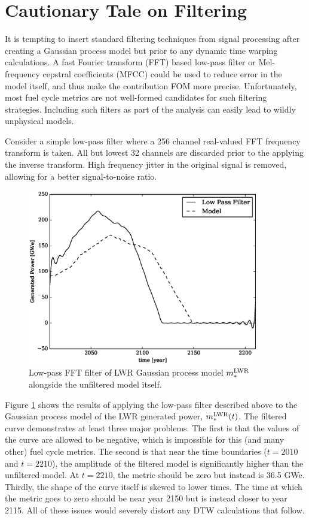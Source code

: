 \clearpage
\section{Cautionary Tale on Filtering}
\label{filtering}

It is tempting to insert standard filtering techniques from signal processing 
after creating a Gaussian process model but prior to any dynamic time warping 
calculations. A fast Fourier transform (FFT) based low-pass filter 
\cite{merletti1999standards,moreland2003fft} or 
Mel-frequency cepstral coefficients (MFCC) \cite{muda2010voice,imai1983cepstral} could be used to reduce error 
in the model itself, 
and thus make the contribution FOM more precise. Unfortunately, most 
fuel cycle metrics are not well-formed candidates for such filtering strategies.
Including such filters as part of the analysis can easily lead to wildly unphysical
models.

Consider a simple low-pass filter where a 256 channel real-valued FFT frequency 
transform is taken.  All but lowest 32 channels are discarded prior to the applying 
the inverse transform. High frequency jitter in the original signal is removed, 
allowing for a better signal-to-noise ratio.

\begin{figure}[htb]
\centering
\includegraphics[width=0.9\textwidth]{fft-lwr-model.eps}
\caption{Low-pass FFT filter of LWR Gaussian process model $m_*^{\mathrm{LWR}}$ alongside
the unfiltered model itself.}
\label{fft-lwr-model}
\end{figure}

Figure \ref{fft-lwr-model} shows the results of applying the low-pass filter 
described above to the Gaussian process model of the LWR generated power, 
$m_*^{\mathrm{LWR}}(t)$.  The filtered curve demonstrates at least three major problems.  The
first is that the values of the curve are allowed to be negative, which is 
impossible for this (and many other) fuel cycle metrics.  The second is that 
near the time boundaries ($t=2010$ and $t=2210$), the amplitude of the filtered model
is significantly higher than the unfiltered model. At $t=2210$, the metric should be zero but
instead is 36.5 GWe. Thirdly, the shape of the curve itself is skewed to lower 
times. The time at which the metric goes to zero should be near year 2150 but is 
instead closer to year 2115.  All of these issues would severely distort any 
DTW calculations that follow.

